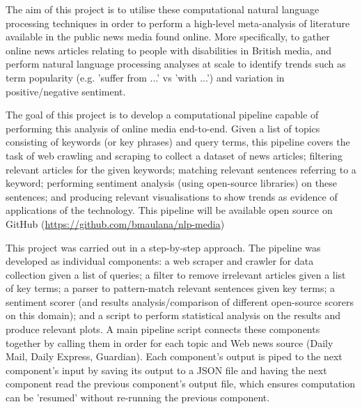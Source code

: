 \documentclass{report}
\begin{document}
The aim of this project is to utilise these computational natural language processing techniques in order to perform a high-level meta-analysis of literature available in the public news media found online.
More specifically, to gather online news articles relating to people with disabilities in British media, and perform natural language processing analyses at scale to identify trends such as term popularity (e.g. 'suffer from ...' vs 'with ...') and variation in positive/negative sentiment.

The goal of this project is to develop a computational pipeline capable of performing this analysis of online media end-to-end.
Given a list of topics consisting of keywords (or key phrases) and query terms, this pipeline covers the task of web crawling and scraping to collect a dataset of news articles; filtering relevant articles for the given keywords; matching relevant sentences referring to a keyword; performing sentiment analysis (using open-source libraries) on these sentences; and producing relevant visualisations to show trends as evidence of applications of the technology.
This pipeline will be available open source on GitHub (\url{https://github.com/bmaulana/nlp-media})

This project was carried out in a step-by-step approach. The pipeline was developed as individual components: a web scraper and crawler for data collection given a list of queries; a filter to remove irrelevant articles given a list of key terms; a parser to pattern-match relevant sentences given key terms; a sentiment scorer (and results analysis/comparison of different open-source scorers on this domain); and a script to perform statistical analysis on the results and produce relevant plots. 
A main pipeline script connects these components together by calling them in order for each topic and Web news source (Daily Mail, Daily Express, Guardian).
Each component's output is piped to the next component's input by saving its output to a JSON file and having the next component read the previous component's output file, which ensures computation can be 'resumed' without re-running the previous component. 
\end{document}

